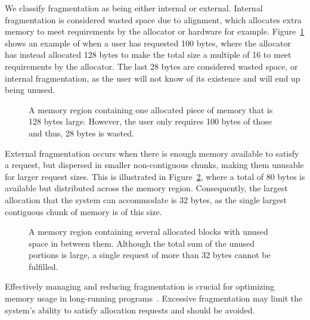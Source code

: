 
We classify fragmentation as being either internal or external. Internal fragmentation is considered wasted space due to alignment, which allocates extra memory to meet requirements by the allocator or hardware for example. Figure~\ref{fig:internal_fragmentation} shows an example of when a user has requested 100 bytes, where the allocator has instead allocated 128 bytes to make the total size a multiple of 16 to meet requirements by the allocator. The last 28 bytes are considered wasted space, or internal fragmentation, as the user will not know of its existence and will end up being unused.

\begin{figure}[H]
    \centering
    \vspace*{0.2cm}
    
    \vspace*{0.2cm}
    \caption{A memory region containing one allocated piece of memory that is 128 bytes large. However, the user only requires 100 bytes of those and thus, 28 bytes is wasted.}
    \label{fig:internal_fragmentation}
\end{figure}

External fragmentation occurs when there is enough memory available to satisfy a request, but dispersed in smaller non-contiguous chunks, making them unusable for larger request sizes. This is illustrated in Figure~\ref{fig:external_fragmentation}, where a total of 80 bytes is available but distributed across the memory region. Consequently, the largest allocation that the system can accommodate is 32 bytes, as the single largest contiguous chunk of memory is of this size.

\begin{figure}[H]
    \centering
    \vspace*{0.2cm}
    \hspace*{1.2cm}
    
    \vspace*{0.2cm}
    \caption{A memory region containing several allocated blocks with unused space in between them. Although the total sum of the unused portions is large, a single request of more than 32 bytes cannot be fulfilled.}
    \label{fig:external_fragmentation}
\end{figure}

Effectively managing and reducing fragmentation is crucial for optimizing memory usage in long-running programs~\cite{gchandbook}. Excessive fragmentation may limit the system's ability to satisfy allocation requests and should be avoided.

